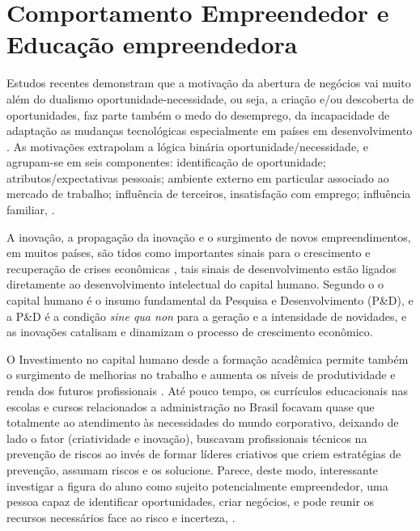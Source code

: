 \section{Comportamento Empreendedor e Educação empreendedora}



Estudos recentes demonstram que a motivação da abertura de negócios vai muito além do dualismo oportunidade-necessidade, ou seja, a criação e/ou descoberta de oportunidades, faz parte também o medo do desemprego, da incapacidade de adaptação as mudanças tecnológicas especialmente em países em desenvolvimento \cite{vale_motivacoes_2014}. As motivações extrapolam a lógica binária oportunidade/necessidade, e agrupam-se em seis componentes: identificação  de  oportunidade;  atributos/expectativas  pessoais;  ambiente  externo em particular  associado  ao  mercado  de  trabalho; influência  de  terceiros,  insatisfação  com  emprego; influência familiar, \cite{vale_motivacoes_2014, rodrigues_intencao_2019,ferreira_intencao_2017}.

A inovação, a propagação da inovação e o surgimento de novos empreendimentos, em muitos países, são tidos como importantes sinais para o crescimento e recuperação de crises econômicas \cite{silva_mudancestrutural_2017}, tais sinais de desenvolvimento estão ligados diretamente ao desenvolvimento intelectual do capital humano. Segundo o \cite{reis_capital_2017} o capital humano é o insumo fundamental da Pesquisa e Desenvolvimento (P\&D), e a P\&D é a condição \textit{sine qua non} para a geração e a intensidade de novidades, e as inovações catalisam e dinamizam o processo de crescimento econômico.

O Investimento no  capital  humano desde a formação acadêmica permite também o surgimento de melhorias no trabalho e aumenta os níveis de produtividade e renda dos futuros profissionais \cite{macedo_capital_2019}. Até pouco tempo, os currículos educacionais nas escolas e cursos relacionados a administração no Brasil focavam quase que totalmente ao atendimento às necessidades do mundo corporativo, deixando de lado o fator (criatividade e inovação), buscavam profissionais técnicos na prevenção de riscos ao invés de formar líderes criativos que criem estratégias de prevenção, assumam riscos \cite{sanna_evolution_1999} e os solucione. 
Parece, deste modo, interessante investigar a figura do aluno como sujeito potencialmente empreendedor, uma pessoa capaz de identificar oportunidades, criar negócios, e pode reunir os recursos necessários face ao risco e incerteza, \cite{pietrovski_alise_2019}.


